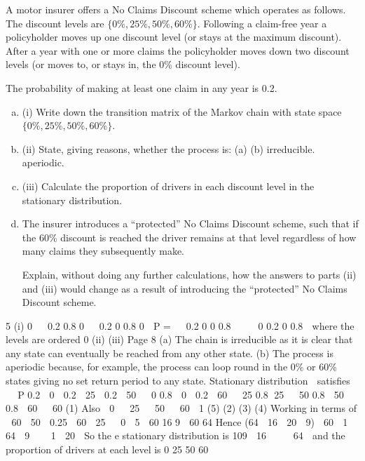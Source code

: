\documentclass[a4paper,12pt]{article}
\begin{document}
A motor insurer offers a No Claims Discount scheme which operates as follows. The discount levels are $\{0\%,25\%, 50\%, 60\%\}$. Following a claim-free year a policyholder moves up one discount level (or stays at the maximum discount). After a year with one or more claims the policyholder moves down two discount levels (or moves to, or stays in, the 0\% discount level).

The probability of making at least one claim in any year is 0.2.
\begin{enumerate}[(a)]
\item (i) Write down the transition matrix of the Markov chain with state space $\{0\%,25\%, 50\%, 60\%\}$.
\item 
(ii) State, giving reasons, whether the process is:
(a)
(b)
irreducible.
aperiodic.

\item 
(iii)
Calculate the proportion of drivers in each discount level in the stationary distribution.

\item 
The insurer introduces a “protected” No Claims Discount scheme, such that if the 60\% discount is reached the driver remains at that level regardless of how many
claims they subsequently make.

Explain, without doing any further calculations, how the answers to parts (ii)
and (iii) would change as a result of introducing the “protected” No Claims
Discount scheme.
\end{enumerate}
5
(i)
0 
 0.2 0.8 0


0.2 0 0.8 0 
P = 
 0.2 0
0 0.8 


 0 0.2 0 0.8 
where the levels are ordered 0%
(ii)
(iii)
Page 8
(a) The chain is irreducible as it is clear that any state can eventually be reached from any other state.
(b) The process is aperiodic because, for example, the process can loop round in the 0\% or 60\% states giving no set return period to any state.
Stationary distribution  satisfies    P
0.2  0  0.2  25  0.2  50   0
0.8  0  0.2  60   25
0.8 25   50
0.8  50  0.8  60   60 (1)
Also  0   25   50   60  1 (5)
(2)
(3)
(4)%
Working in terms of  60
 50  0.25  60
 25 
 0 
5
 60
16
9
 60
64
Hence
(64  16  20  9)
 60  1
64
 9 
 
1  20 
So the e stationary distribution is
109  16 
 
 64 
and the proportion of drivers at each level is
0%
25%
50%
60%
\end{document}
